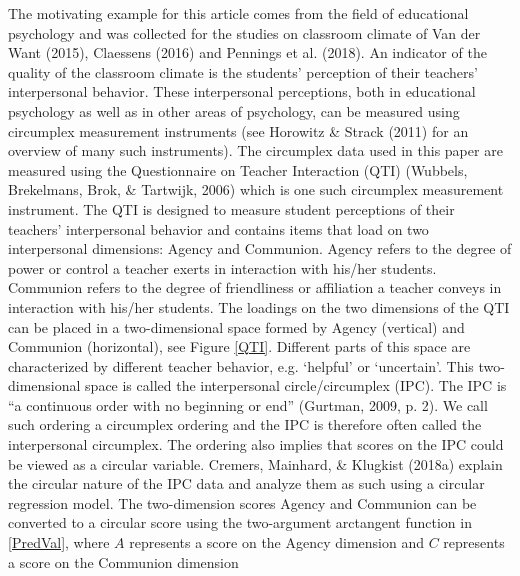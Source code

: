 \documentclass[12pt,]{article}
\DeclareRobustCommand{\VANDER}[3]{#2} %
\begin{document}
The motivating example for this article comes from the field of
educational psychology and was collected for the studies on classroom
climate of \VANDER{Want}{Van der}{van der} Want (2015), Claessens (2016)
and Pennings et al. (2018). An indicator of the quality of the classroom
climate is the students' perception of their teachers' interpersonal
behavior. These interpersonal perceptions, both in educational
psychology as well as in other areas of psychology, can be measured
using circumplex measurement instruments (see Horowitz \& Strack (2011)
for an overview of many such instruments).\newline
\indent The circumplex data used in this paper are measured using the
Questionnaire on Teacher Interaction (QTI) (Wubbels, Brekelmans, Brok,
\& Tartwijk, 2006) which is one such circumplex measurement instrument.
The QTI is designed to measure student perceptions of their teachers'
interpersonal behavior and contains items that load on two interpersonal
dimensions: Agency and Communion. Agency refers to the degree of power
or control a teacher exerts in interaction with his/her students.
Communion refers to the degree of friendliness or affiliation a teacher
conveys in interaction with his/her students. The loadings on the two
dimensions of the QTI can be placed in a two-dimensional space formed by
Agency (vertical) and Communion (horizontal), see Figure \ref{QTI}.
Different parts of this space are characterized by different teacher
behavior, e.g. `helpful' or `uncertain'. This two-dimensional space is
called the interpersonal circle/circumplex (IPC). The IPC is ``a
continuous order with no beginning or end'' (Gurtman, 2009, p. 2). We
call such ordering a circumplex ordering and the IPC is therefore often
called the interpersonal circumplex. The ordering also implies that
scores on the IPC could be viewed as a circular variable.\newline
\indent Cremers, Mainhard, \& Klugkist (2018a) explain the circular
nature of the IPC data and analyze them as such using a circular
regression model. The two-dimension scores Agency and Communion can be
converted to a circular score using the two-argument arctangent function
in \eqref{PredVal}, where \(A\) represents a score on the Agency
dimension and \(C\) represents a score on the Communion dimension
\end{document}
